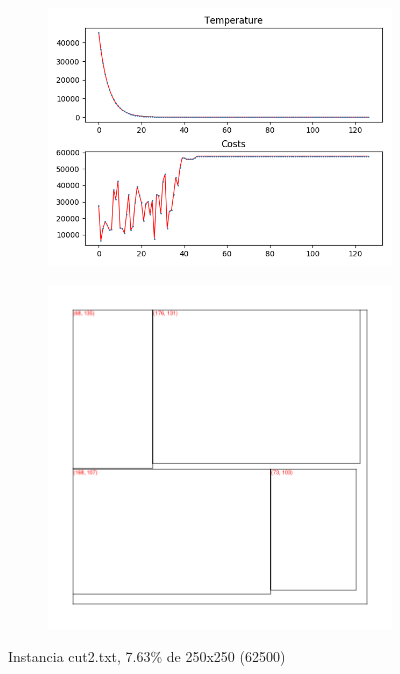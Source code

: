 \begin{figure}
\centering
\begin{subfigure}{.5\textwidth}
  \centering
  \includegraphics[width=1\linewidth]{results/cut2/3/plot}
  \label{fig:sub1}
\end{subfigure}%
\begin{subfigure}{.5\textwidth}
  \centering
  \includegraphics[width=1\linewidth]{results/cut2/3/cut}
  \label{fig:sub2}
\end{subfigure}
\caption{Instancia cut2.txt, 7.63\% de 250x250 (62500)}
\label{fig:test}
\end{figure}


